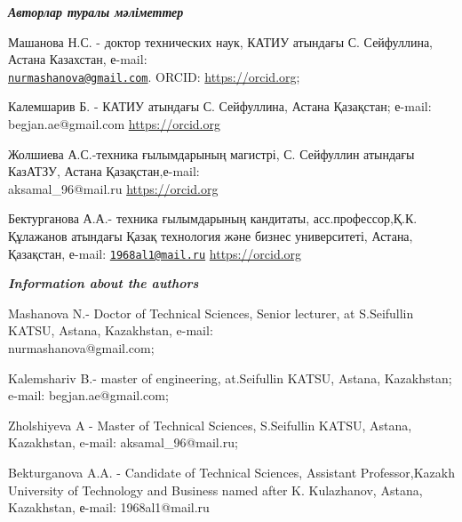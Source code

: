 \begin{authorinfo}
\emph{{\bfseries Авторлар туралы мәліметтер}}

Машанова Н.С. - доктор технических наук, КАТИУ атындағы С.
Сейфуллина, Астана Казахстан, е-mail:\\
\href{mailto:nurmashanova@gmail.com}{\nolinkurl{nurmashanova@gmail.com}}.
ORCID: \href{https://orcid.org/0000-0001-8664-5173}{https://orcid.org};

Калемшарив Б. - КАТИУ атындағы С. Сейфуллина, Астана Қазақстан; е-mail:
begjan.ae@gmail.com \href{https://orcid.org/0000-0002-8036-9718}{https://orcid.org}

Жолшиева А.С.-техника ғылымдарының магистрі, С. Сейфуллин атындағы
КазАТЗУ, Астана Қазақстан,е-mail: \\aksamal\_96@mail.ru
\href{https://orcid.org/0009-0002-9232-782X}{https://orcid.org}

Бектурганова А.А.- техника ғылымдарының кандитаты, асс.профессор,Қ.К.
Құлажанов атындағы Қазақ технология және бизнес университеті, Астана,
Қазақстан, е-mail:
\href{mailto:1968al1@mail.ru}{\nolinkurl{1968al1@mail.ru}}
\href{https://orcid.org/0000-0002-0906-2027}{https://orcid.org}

\emph{{\bfseries Information about the authors}}

Mashanova N.- Doctor of Technical Sciences, Senior lecturer, at
S.Seifullin KATSU, Astana, Kazakhstan, e-mail: \\nurmashanova@gmail.com;

Kalemshariv B.- master of engineering, at.Seifullin KATSU, Astana,
Kazakhstan; e-mail: begjan.ae@gmail.com;

Zholshiyeva A - Master of Technical Sciences, S.Seifullin KATSU, Astana,
Kazakhstan, e-mail: aksamal\_96@mail.ru;

Bekturganova A.A. - Candidate of Technical Sciences, Assistant
Professor,Kazakh University of Technology and Business named after K.
Kulazhanov, Astana, Kazakhstan, е-mail: 1968al1@mail.ru
\end{authorinfo}
